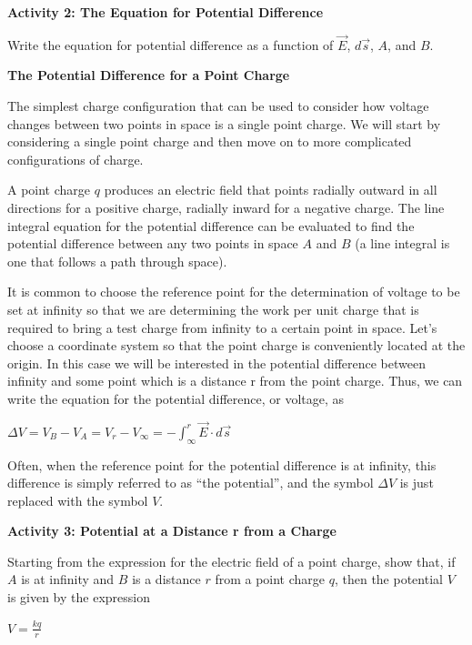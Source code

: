 \textbf{Activity 2: The Equation for Potential Difference}

Write the equation for potential difference as a function of \( \overrightarrow{E} \),
\( d\overrightarrow{s} \), $A$, and $B$.
\vspace{15mm}

\textbf{The Potential Difference for a Point Charge}

The simplest charge configuration that can be used to consider how
voltage changes between two points in space is a single point charge.
We will start by considering a single point charge and then move on
to more complicated configurations of charge.

A point charge $q$ produces an electric field that points radially outward
in all directions for a positive charge, radially inward for a negative charge. The line integral equation for the potential difference
can be evaluated to find the potential difference between any two
points in space $A$ and $B$ (a line integral is one that follows a path
through space).

It is common to choose the reference point for the determination of
voltage to be set at infinity so that we are determining the work
per unit charge that is required to bring a test charge from infinity
to a certain point in space. Let's choose a coordinate system so that
the point charge is conveniently located at the origin. In this case
we will be interested in the potential difference between infinity
and some point which is a distance r from the point charge. Thus,
we can write the equation for the potential difference, or voltage,
as

{\centering \( \Delta V=V_{B}-V_{A}=V_{r}-V_{\infty }=-\int ^{r}_{\infty }\overrightarrow{E}\cdot d\overrightarrow{s} \)\par}

Often, when the reference point for the potential difference is at
infinity, this difference is simply referred to as {}``the potential'',
and the symbol \( \Delta V \) is just replaced with the symbol $V$.

\textbf{Activity 3: Potential at a Distance r from a Charge}

Starting from the expression for the electric field of a point charge,
show that, if $A$ is at infinity and $B$ is a distance $r$ from a point
charge $q$, then the potential $V$ is given by the expression

{\centering \( V=\frac{kq}{r} \)\par}

